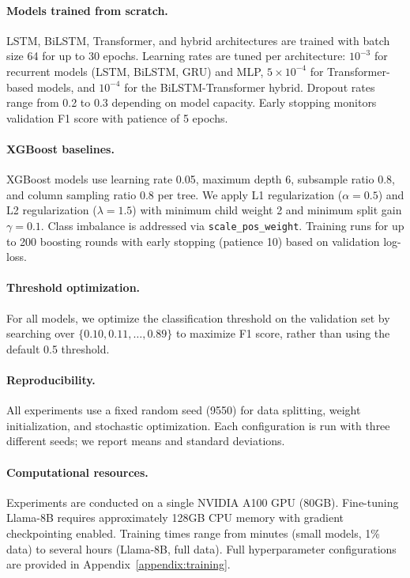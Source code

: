 \paragraph{Models trained from scratch.}
LSTM, BiLSTM, Transformer, and hybrid architectures are trained with batch size 64 for up to 30 epochs. Learning rates are tuned per architecture: $10^{-3}$ for recurrent models (LSTM, BiLSTM, GRU) and MLP, $5 \times 10^{-4}$ for Transformer-based models, and $10^{-4}$ for the BiLSTM-Transformer hybrid. Dropout rates range from 0.2 to 0.3 depending on model capacity. Early stopping monitors validation F1 score with patience of 5 epochs.

\paragraph{XGBoost baselines.}
XGBoost models use learning rate 0.05, maximum depth 6, subsample ratio 0.8, and column sampling ratio 0.8 per tree. We apply L1 regularization ($\alpha=0.5$) and L2 regularization ($\lambda=1.5$) with minimum child weight 2 and minimum split gain $\gamma=0.1$. Class imbalance is addressed via \texttt{scale\_pos\_weight}. Training runs for up to 200 boosting rounds with early stopping (patience 10) based on validation log-loss.

\paragraph{Threshold optimization.}
For all models, we optimize the classification threshold on the validation set by searching over $\{0.10, 0.11, \ldots, 0.89\}$ to maximize F1 score, rather than using the default 0.5 threshold.

\paragraph{Reproducibility.}
All experiments use a fixed random seed (9550) for data splitting, weight initialization, and stochastic optimization. Each configuration is run with three different seeds; we report means and standard deviations.

\paragraph{Computational resources.}
Experiments are conducted on a single NVIDIA A100 GPU (80GB). Fine-tuning Llama-8B requires approximately 128GB CPU memory with gradient checkpointing enabled. Training times range from minutes (small models, 1\% data) to several hours (Llama-8B, full data). Full hyperparameter configurations are provided in Appendix~\ref{appendix:training}.

